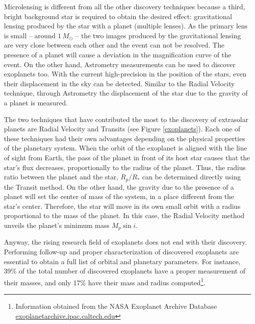 Microlensing is different from all the other discovery techniques because a third, bright background star is required to obtain the desired effect: gravitational lensing produced by the star with a planet (multiple lenses). As the primary lens is small -- around $1\,M_{\odot}$ -- the two images produced by the gravitational lensing are very close between each other and the event can not be resolved. The presence of a planet will cause a deviation in the magnification curve of the event. On the other hand, Astrometry measurements can be used to discover exoplanets too. With the current high-precision in the position of the stars, even their displacement in the sky can be detected. Similar to the Radial Velocity technique, through Astrometry the displacement of the star due to the gravity of a planet is measured. 

The two techniques that have contributed the most to the discovery of extrasolar planets are Radial Velocity and Transits (see Figure \ref{exoplanets}). Each one of these techniques had their own advantages depending on the physical properties of the planetary system. When the orbit of the exoplanet is aligned with the line of sight from Earth, the pass of the planet in front of its host star causes that the star's flux decreases, proportionally to the radius of the planet. Thus, the radius ratio between the planet and the star, $R_{p}/R_{*}$ can be determined directly using the Transit method. On the other hand, the gravity due to the presence of a planet will set the center of mass of the system, in a place different from the star's center. Therefore, the star will move in its own small orbit with a radius proportional to the mass of the planet. In this case, the Radial Velocity method unveils the planet's minimum mass $M_{p}\sin i$. 

Anyway, the rising research field of exoplanets does not end with their discovery. Performing follow-up and proper characterization of discovered exoplanets are essential to obtain a full list of orbital and planetary parameters. For instance,  39\%  of the total number of discovered exoplanets have a proper measurement of their masses, and only 17\% have their mass and radius computed\footnote{Information obtained from the NASA Exoplanet Archive Database \url{exoplanetarchive.ipac.caltech.edu}}. 


